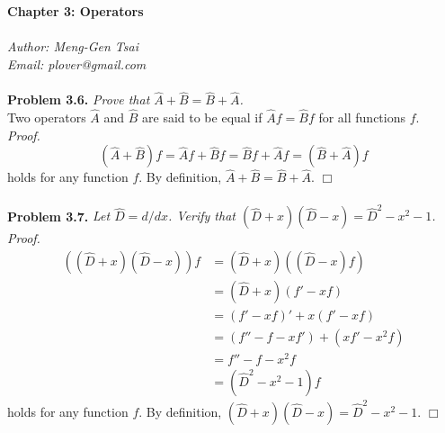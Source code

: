 \documentclass{article}
\begin{document}
\textbf{\Large Chapter 3: Operators} \\\\



\emph{Author: Meng-Gen Tsai} \\
\emph{Email: plover@gmail.com} \\\\






\textbf{Problem 3.6.}
\emph{Prove that $\hat{A} + \hat{B} = \hat{B} + \hat{A}$. } \\

Two operators $\hat{A}$ and $\hat{B}$ are said to be equal if
$\hat{A}f = \hat{B}f$ for all functions $f$. \\

\emph{Proof.}
$$(\hat{A} + \hat{B})f = \hat{A}f + \hat{B}f
= \hat{B}f + \hat{A}f = (\hat{B} + \hat{A})f$$
holds for any function $f$.
By definition,
$\hat{A} + \hat{B} = \hat{B} + \hat{A}$.
$\Box$ \\\\






\textbf{Problem 3.7.}
\emph{Let $\hat{D} = d/dx$.
Verify that $(\hat{D}+x)(\hat{D}-x) = \hat{D}^2-x^2-1$. } \\

\emph{Proof.}
\begin{align*}
((\hat{D}+x)(\hat{D}-x))f
&= (\hat{D}+x)((\hat{D}-x)f) \\
&= (\hat{D}+x)(f'-xf) \\
&= (f'-xf)' + x(f'-xf) \\
&= (f''-f-xf') + (xf'-x^2f) \\
&= f''-f-x^2f \\
&= (\hat{D}^2-x^2-1)f
\end{align*}
holds for any function $f$.
By definition,
$(\hat{D}+x)(\hat{D}-x) = \hat{D}^2-x^2-1$.
$\Box$ \\\\



\end{document}
